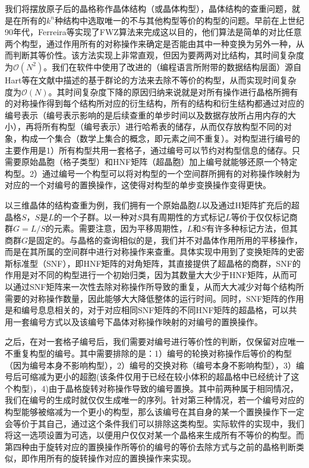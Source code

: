 我们将摆放原子后的晶格称作晶体结构（或晶体构型），晶体结构的查重问题，就是在所有的$k^n$种结构中选取唯一的不与其他构型等价的构型的问题。早前在上世纪90年代，Ferreira等\cite{ferreira1991stability}实现了FWZ算法来完成这以目的，他们算法是简单的对比任意两个构型，通过作用所有的对称操作来确定是否能由其中一种变换为另外一种，从而判断其等价性。该方法实现上非常直观，但因为要两两对比结构，其时间复杂度为$\mathcal{O}(N^2)$。我们在软件中使用了改进的（编程语言所附带的数据结构层面）源自Hart等在文献\cite{hart2008algorithm}中描述的基于群论的方法来去除不等价的构型，从而实现时间复杂度为$\mathcal{O}(N)$。其时间复杂度下降的原因归纳来说就是对所有操作进行晶格所拥有的对称操作得到每个结构所对应的衍生结构，所有的结构和衍生结构都通过对应的编号表示（编号表示影响的是后续查重的单步时间以及数据存放所占用内存的大小），再将所有构型（编号表示）进行哈希表的储存，从而仅存放构型不同的对象，构成一个集合（数学上集合的概念，即元素之间不重复）。对构型进行编号的主要作用是1）所有构型共用一套格子，通过编号可以节约对构型信息的储存。只需要原始晶胞（格子类型）和HNF矩阵（超晶胞）加上编号就能够还原一个特定构型。2）通过编号一个构型可以将对构型的一个空间群所拥有的对称操作映射为对应的一个对编号的置换操作，这使得对构型的单步变换操作变得更快。

以三维晶体的结构查重为例，我们拥有一个原始晶胞$L$以及通过H矩阵扩充后的超晶格$S$，$S$是$L$的一个子群。以一种对$S$具有周期性的方式标记$L$等价于仅仅标记商群$G=L/S$的元素。需要注意，因为平移周期性，$L$和$S$有许多种标记方法，但其商群$G$是固定的。与晶格的查询相似的是，我们并不对晶体作用所用的平移操作，而是在其所属的空间群中进行对称操作来查重。具体实现中用到了变换矩阵的史密斯标准型（SNF），即HNF矩阵的对角矩阵，其直接提供了超晶格的商群，SNF的作用是对不同的构型进行一个初始归类，因为其数量大大少于HNF矩阵，从而可以通过SNF矩阵来一次性去除对称操作所导致的重复，从而大大减少对每个结构所需要的对称操作数量，因此能够大大降低整体的运行时间。同时，SNF矩阵的作用是和编号息息相关的，对于对应相同SNF矩阵的不同HNF矩阵的超晶格，可以共用一套编号方式以及该编号下晶体对称操作映射的对编号的置换操作。

之后，在对一套格子编号后，我们需要对编号进行等价性的判断，仅保留对应唯一不重复构型的编号。其中需要排除的是：1）编号的轮换对称操作后等价的构型（因为编号本身不影响构型），2）编号的交换对称（编号本身不影响构型），3）编号后可缩减为更小的超胞(该条件仅用于已经在较小体积的超晶格中已经统计了这个构型)，4)由于晶格旋转对称操作导致的编号置换。其中前两种属于相同情况，我们在编号的生成时就仅仅生成唯一的序列。针对第三种情况，若一个编号对应的构型能够被缩减为一个更小的构型，那么该编号在其自身的某一个置换操作下一定会等价于其自己，通过这个条件我们可以排除这类构型。实际软件的实现中，我们将这一选项设置为可选，以便用户仅仅对某一个晶格来生成所有不等价的构型。而第四种由于旋转对应的置换操作所等价的编号的等价去除方式与之前的晶格判断类似，即作用所有的旋转操作对应的置换操作来实现。

